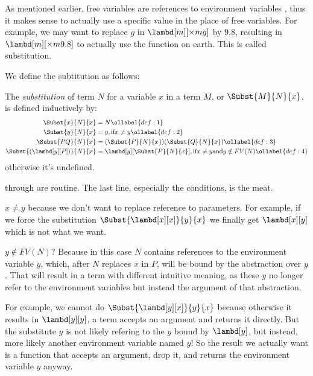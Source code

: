 \documentclass[../../../include/open-logic-section]{subfiles}
\begin{document}

As mentioned earlier, free variables are references to environment variables
, thus it makes sense to actually use a specific value in the place of free
variables. For example, we may want to replace $g$ in
$\lambd[m][\times m g]$ by $9.8$, resulting in $\lambd[m][\times m
9.8]$ to actually use the function on earth. This is
called substitution.

We define the subtitution as follows:

\begin{defn}[Substitution] 
  The \emph{substitution} of term $N$ for a variable $x$ in a term $M$, or
  $\Subst{M}{N}{x}$,  is defined inductively by:
  \begin{align}
    \Subst{x}{N}{x}       &= N \ollabel{def:1} \\
    \Subst{y}{N}{x}       &= y, \text{if} x \neq y \ollabel{def:2} \\
    \Subst{PQ}{N}{x} &= (\Subst{P}{N}{x}) (\Subst{Q}{N}{x}) \ollabel{def:3} \\
    \Subst{(\lambd[y][P])}{N}{x}  &= \lambd[y][\Subst{P}{N}{x}], \text{if} x \neq y
                                        \text{and} y \notin FV(N) \ollabel{def:4}
  \end{align}
  otherwise it's undefined.
\end{defn}

 through  are routine. The last line,
especially the conditions, is the meat. 

$x \neq y$ because we don't want to replace reference to parameters.
For example, if we force the substitution
$\Subst{\lambd[x][x]}{y}{x}$ we finally get $\lambd[x][y]$ which
is not what we want.

$y \notin FV(N)$? Because in this case $N$ contains references to the environment variable $y$, which,
after $N$ replaces $x$ in $P$, will be bound by the abstraction over
$y$. That will result in a term with different intuitive meaning, as
these $y$ no longer refer to the environment variables but instead
the argument of that abstraction. 

For example, we cannot do $\Subst{\lambd[y][x]}{y}{x}$ because
otherwise it results in $\lambd[y][y]$, a term accepts an argument and
returns it directly. But the substitute $y$ is not likely refering
to the $y$ bound by $\lambd[y]$, but instead, more likely another
environment variable named $y$! So the result we actually want is a
function that accepts an argument, drop it, and returns the
environment variable $y$ anyway.
\end{document}
